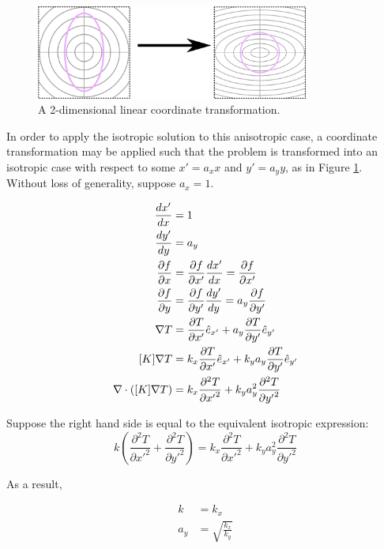 \begin{figure}[h]
\centering
\includegraphics[width=0.8\textwidth]{fig/coordinate_transformation.png}
\caption{A 2-dimensional linear coordinate transformation.}
\label{fig:coord_trans}
\end{figure}

In order to apply the isotropic solution to this anisotropic case, a coordinate transformation may be applied such that the problem is transformed into
an isotropic case with respect to some \(x' = a_x x\) and \(y' = a_y y\), as in
Figure \ref{fig:coord_trans}.
Without loss of generality, suppose \(a_x = 1\).

\begin{align}
\frac{dx'}{dx} &= 1\\
\frac{dy'}{dy} &= a_y\\
\frac{\partial f}{\partial x} &= \frac{\partial f}{\partial x'}\frac{dx'}{dx} = \frac{\partial f}{\partial x'}\\
\frac{\partial f}{\partial y} &= \frac{\partial f}{\partial y'}\frac{dy'}{dy} = a_y\frac{\partial f}{\partial y'}\\
\nabla T &= \frac{\partial T}{\partial x'} \hat{e}_{x'} + a_y\frac{\partial T}{\partial y'} \hat{e}_{y'} \\
[K]\nabla T &= k_x\frac{\partial T}{\partial x'} \hat{e}_{x'} + k_ya_y\frac{\partial T}{\partial y'} \hat{e}_{y'}\\
\nabla \cdot \left([K]\nabla T\right) &= k_x\frac{\partial^2 T}{\partial {x'}^2} + k_ya_y^2\frac{\partial^2 T}{\partial {y'}^2}\\
\end{align}

Suppose the right hand side is equal to the equivalent isotropic expression:
\begin{equation*}
k\left(\frac{\partial^2 T}{\partial {x'}^2} + \frac{\partial^2 T}{\partial {y'}^2} \right) = k_x\frac{\partial^2 T}{\partial {x'}^2} + k_ya_y^2\frac{\partial^2 T}{\partial {y'}^2}
\end{equation*}

As a result,

\begin{align*}
k &= k_x\\ a_y &= \sqrt{\frac{k_x}{k_y}}\\
\end{align*}

